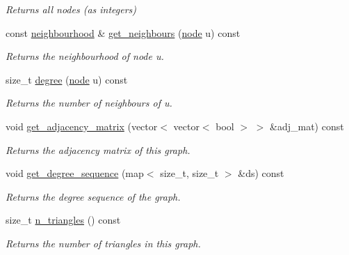 \begin{DoxyCompactItemize}
\begin{DoxyCompactList}\small\item\em Returns all nodes (as integers) \end{DoxyCompactList}\item 
const \hyperlink{namespacelgraph_1_1utils_a0f2ef47028a466d26841709e705390ac}{neighbourhood} \& \hyperlink{classlgraph_1_1utils_1_1xxgraph_a2c5332c4663c2d52828893f095a68202}{get\+\_\+neighbours} (\hyperlink{namespacelgraph_1_1utils_ab9c6b34241f0b68372c55f34c460e863}{node} u) const 
\begin{DoxyCompactList}\small\item\em Returns the neighbourhood of node u. \end{DoxyCompactList}\item 
size\+\_\+t \hyperlink{classlgraph_1_1utils_1_1xxgraph_af588aa4c68004a31aa143024cdb6dcc9}{degree} (\hyperlink{namespacelgraph_1_1utils_ab9c6b34241f0b68372c55f34c460e863}{node} u) const 
\begin{DoxyCompactList}\small\item\em Returns the number of neighbours of u. \end{DoxyCompactList}\item 
void \hyperlink{classlgraph_1_1utils_1_1xxgraph_a401454762f6b4b69f13ab0a10729c457}{get\+\_\+adjacency\+\_\+matrix} (vector$<$ vector$<$ bool $>$ $>$ \&adj\+\_\+mat) const \hypertarget{classlgraph_1_1utils_1_1xxgraph_a401454762f6b4b69f13ab0a10729c457}{}\label{classlgraph_1_1utils_1_1xxgraph_a401454762f6b4b69f13ab0a10729c457}

\begin{DoxyCompactList}\small\item\em Returns the adjacency matrix of this graph. \end{DoxyCompactList}\item 
void \hyperlink{classlgraph_1_1utils_1_1xxgraph_aff73f5ac4cd2732caa0c528eb1c1833c}{get\+\_\+degree\+\_\+sequence} (map$<$ size\+\_\+t, size\+\_\+t $>$ \&ds) const 
\begin{DoxyCompactList}\small\item\em Returns the degree sequence of the graph. \end{DoxyCompactList}\item 
size\+\_\+t \hyperlink{classlgraph_1_1utils_1_1xxgraph_ad4f25a8b29c6f26bc1567cb9c5a564ba}{n\+\_\+triangles} () const 
\begin{DoxyCompactList}\small\item\em Returns the number of triangles in this graph. \end{DoxyCompactList}\end{DoxyCompactItemize}
